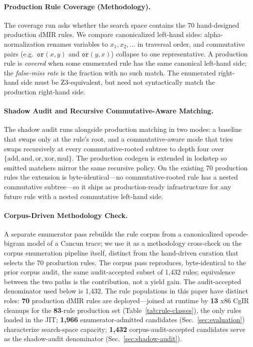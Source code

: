 \paragraph{Production Rule Coverage (Methodology).} The coverage run asks
whether the search space contains the 70 hand-designed production dMIR
rules. We compare canonicalized left-hand sides: alpha-normalization
renames variables to $x_1, x_2, \ldots$ in traversal order, and
commutative pairs (e.g.\ $\texttt{or}(x,y)$ and $\texttt{or}(y,x)$)
collapse to one representative. A production rule is \emph{covered} when
some enumerated rule has the same canonical left-hand side; the
\emph{false-miss rate} is the fraction with no such match. The enumerated
right-hand side must be Z3-equivalent, but need not syntactically match
the production right-hand side.

\paragraph{Shadow Audit and Recursive Commutative-Aware Matching.} The
shadow audit runs alongside production matching in two modes: a baseline
that swaps only at the rule's root, and a commutative-aware mode that
tries swaps recursively at every commutative-rooted subtree to depth four
over $\{\text{add}, \text{and}, \text{or}, \text{xor}, \text{mul}\}$.
The production codegen is extended in lockstep so
emitted matchers mirror the same recursive policy. On the existing 70
production rules the extension is byte-identical---no commutative-rooted
rule has a nested commutative subtree---so it ships as production-ready
infrastructure for any future rule with a nested commutative left-hand
side.

\paragraph{Corpus-Driven Methodology Check.} A separate enumerator pass
rebuilds the rule corpus from a canonicalized opcode-bigram model of a
Cancun trace; we use it as a methodology cross-check on the corpus
enumeration pipeline itself, distinct from the hand-driven curation
that selects the 70 production rules. The corpus pass reproduces,
byte-identical to the prior corpus audit, the same audit-accepted subset
of 1{,}432 rules; equivalence between the two paths is the contribution,
not a yield gain. The audit-accepted denominator used below is 1{,}432.
The rule populations in this paper have distinct roles: \textbf{70}
production dMIR rules are deployed---joined at runtime by \textbf{13}
x86 CgIR cleanups for the \textbf{83}-rule production set
(Table~\ref{tab:rule-classes}), the only rules loaded in the JIT;
\textbf{1{,}966} enumerator-admitted candidates
(Sec.~\ref{sec:evaluation}) characterize search-space capacity;
\textbf{1{,}432} corpus-audit-accepted candidates serve as the
shadow-audit denominator (Sec.~\ref{sec:shadow-audit}).

